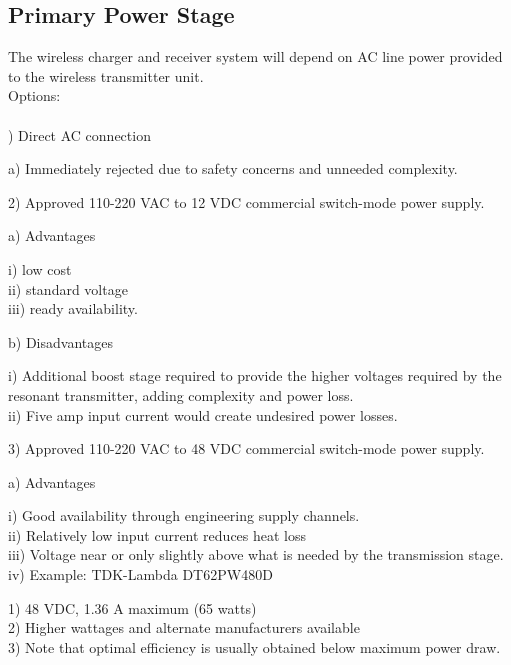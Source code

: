\documentclass[12pt]{article}
\begin{document}
\subsection{Primary Power Stage}
\indent \indent
The wireless charger and receiver system will depend on AC line power provided to the wireless transmitter unit.\\

\noindent
Options:\\
\hfill \\
) Direct AC connection
\begin{addmargin}[0.50cm]{0.75cm}
a)  Immediately rejected due to safety concerns and unneeded complexity.
\end{addmargin}
2) Approved 110-220 VAC to 12 VDC commercial switch-mode power supply.
\begin{addmargin}[0.50cm]{0.75cm}
a)  Advantages
\begin{addmargin}[0.50cm]{0.75cm}
i) \space\space  low cost\\
ii) \space  standard voltage\\
iii)  ready availability.
\end{addmargin}
b)  Disadvantages
\begin{addmargin}[0.50cm]{0.50cm}
i)  Additional boost stage required to provide the higher voltages required by the resonant transmitter, adding complexity and power loss.\\
ii)  Five amp input current would create undesired power losses.
\end{addmargin}
\end{addmargin}
3) Approved 110-220 VAC to 48 VDC commercial switch-mode power supply.
\begin{addmargin}[0.50cm]{0.75cm}
a)  Advantages
\begin{addmargin}[0.50cm]{0.75cm}
i) \space\space Good availability through engineering supply channels.\\
ii) \space   Relatively low input current reduces heat loss\\
iii)   Voltage near or only slightly above what is needed by the transmission stage.\\
iv)  Example: TDK-Lambda DT62PW480D
\begin{addmargin}[0.50cm]{0.75cm}
1) 48 VDC, 1.36 A maximum (65 watts)\\
2) Higher wattages and alternate manufacturers available\\
3) Note that optimal efficiency is usually obtained below maximum power draw.\\
\end{addmargin}
\end{addmargin}
\end{addmargin}
\end{document}
